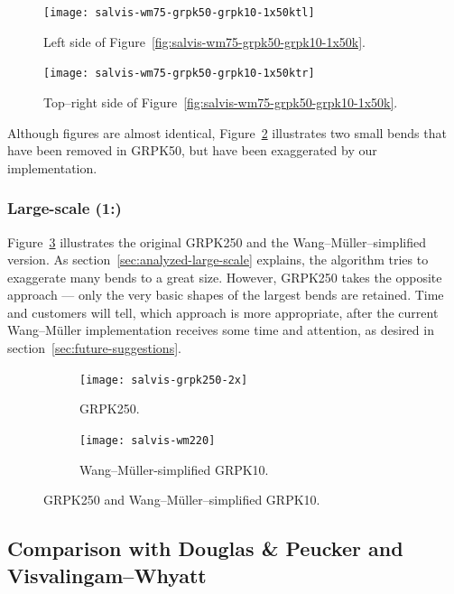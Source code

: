 \documentclass[a4paper]{article}
\newcommand{\DP}{Douglas \& Peucker}
\newcommand{\VW}{Visvalingam--Whyatt}
\newcommand{\WM}{Wang--M{\"u}ller}
\begin{document}
\begin{figure}[h!]
    \centering
    \texttt{[image: salvis-wm75-grpk50-grpk10-1x50ktl]}
    \caption{Left side of Figure~\ref{fig:salvis-wm75-grpk50-grpk10-1x50k}.}
    \label{fig:salvis-wm75-grpk50-grpk10-1x50ktl}
\end{figure}

\begin{figure}[h!]
    \centering
    \texttt{[image: salvis-wm75-grpk50-grpk10-1x50ktr]}
    \caption{Top--right side of Figure~\ref{fig:salvis-wm75-grpk50-grpk10-1x50k}.}
    \label{fig:salvis-wm75-grpk50-grpk10-1x50ktr}
\end{figure}

Although figures are almost identical,
Figure~\ref{fig:salvis-wm75-grpk50-grpk10-1x50ktr} illustrates two small bends
that have been removed in GRPK50, but have been exaggerated by our
implementation.

\clearpage

\subsubsection{Large-scale (1:)}
\label{sec:national-large-scale}

Figure~\ref{fig:salvis-wm220} illustrates the original GRPK250 and the
{\WM}--simplified version. As section~\ref{sec:analyzed-large-scale} explains,
the algorithm tries to exaggerate many bends to a great size. However, GRPK250
takes the opposite approach --- only the very basic shapes of the largest bends
are retained. Time and customers will tell, which approach is more appropriate,
after the current {\WM} implementation receives some time and attention, as
desired in section~\ref{sec:future-suggestions}.

\begin{figure}[h!]
    \centering
    \begin{subfigure}[b]{.49\textwidth}
        \texttt{[image: salvis-grpk250-2x]}
        \caption{GRPK250.}
    \end{subfigure}
    \hfill
    \begin{subfigure}[b]{.49\textwidth}
        \centering
        \texttt{[image: salvis-wm220]}
        \caption{{\WM}-simplified GRPK10.}
    \end{subfigure}
    \caption{GRPK250 and {\WM}--simplified GRPK10.}
    \label{fig:salvis-wm220}
\end{figure}

\subsection{Comparison with {\DP} and {\VW}}
\end{document}
